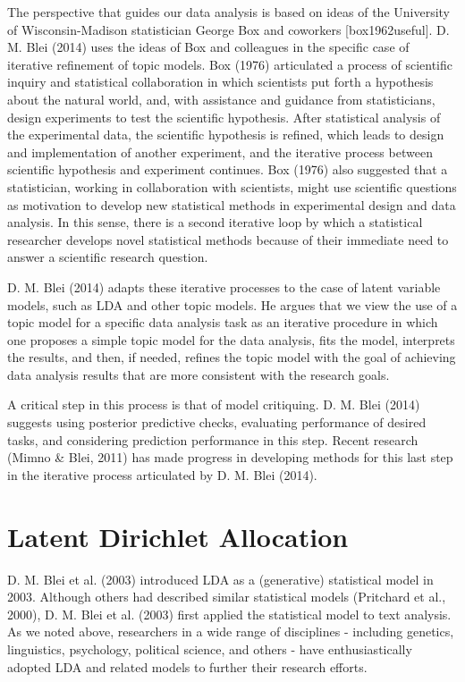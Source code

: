 \documentclass[12pt,]{article}
\begin{document}
The perspective that guides our data analysis is based on ideas of the
University of Wisconsin-Madison statistician George Box and coworkers
{[}box1962useful{]}. D. M. Blei (2014) uses the ideas of Box and
colleagues in the specific case of iterative refinement of topic models.
Box (1976) articulated a process of scientific inquiry and statistical
collaboration in which scientists put forth a hypothesis about the
natural world, and, with assistance and guidance from statisticians,
design experiments to test the scientific hypothesis. After statistical
analysis of the experimental data, the scientific hypothesis is refined,
which leads to design and implementation of another experiment, and the
iterative process between scientific hypothesis and experiment
continues. Box (1976) also suggested that a statistician, working in
collaboration with scientists, might use scientific questions as
motivation to develop new statistical methods in experimental design and
data analysis. In this sense, there is a second iterative loop by which
a statistical researcher develops novel statistical methods because of
their immediate need to answer a scientific research question.

D. M. Blei (2014) adapts these iterative processes to the case of latent
variable models, such as LDA and other topic models. He argues that we
view the use of a topic model for a specific data analysis task as an
iterative procedure in which one proposes a simple topic model for the
data analysis, fits the model, interprets the results, and then, if
needed, refines the topic model with the goal of achieving data analysis
results that are more consistent with the research goals.

A critical step in this process is that of model critiquing. D. M. Blei
(2014) suggests using posterior predictive checks, evaluating
performance of desired tasks, and considering prediction performance in
this step. Recent research (Mimno \& Blei, 2011) has made progress in
developing methods for this last step in the iterative process
articulated by D. M. Blei (2014).

\section{Latent Dirichlet Allocation}\label{latent-dirichlet-allocation}

D. M. Blei et al. (2003) introduced LDA as a (generative) statistical
model in 2003. Although others had described similar statistical models
(Pritchard et al., 2000), D. M. Blei et al. (2003) first applied the
statistical model to text analysis. As we noted above, researchers in a
wide range of disciplines - including genetics, linguistics, psychology,
political science, and others - have enthusiastically adopted LDA and
related models to further their research efforts.
\end{document}
